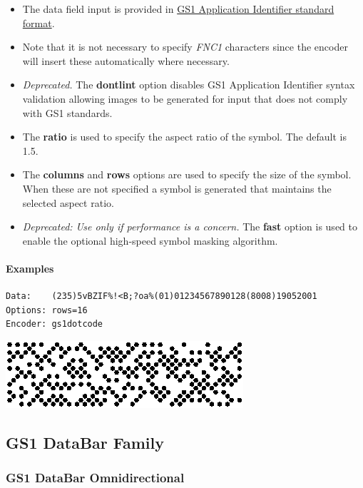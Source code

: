 \begin{itemize}
\tightlist
\item
  The data field input is provided in
  \protect\hyperlink{gs1-application-identifier-standard-format}{GS1
  Application Identifier standard format}.
\item
  Note that it is not necessary to specify \emph{FNC1} characters since
  the encoder will insert these automatically where necessary.
\item
  \emph{Deprecated.} The \textbf{dontlint} option disables GS1
  Application Identifier syntax validation allowing images to be
  generated for input that does not comply with GS1 standards.
\item
  The \textbf{ratio} is used to specify the aspect ratio of the symbol.
  The default is 1.5.
\item
  The \textbf{columns} and \textbf{rows} options are used to specify the
  size of the symbol. When these are not specified a symbol is generated
  that maintains the selected aspect ratio.
\item
  \emph{Deprecated: Use only if performance is a concern.} The
  \textbf{fast} option is used to enable the optional high-speed symbol
  masking algorithm.
\end{itemize}

\hypertarget{examples-23}{%
\paragraph{Examples}\label{examples-23}}

\begin{verbatim}
Data:    (235)5vBZIF%!<B;?oa%(01)01234567890128(8008)19052001
Options: rows=16
Encoder: gs1dotcode
\end{verbatim}

\includegraphics{images/gs1dotcode-1.eps}

\hypertarget{gs1-databar-family}{%
\subsection{GS1 DataBar Family}\label{gs1-databar-family}}

\hypertarget{gs1-databar-omnidirectional}{%
\subsubsection{GS1 DataBar
Omnidirectional}\label{gs1-databar-omnidirectional}}

